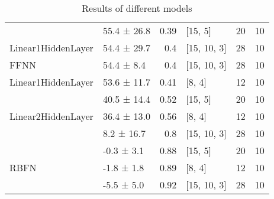 \begin{table*}
\begin{tabular}{llrlrr}
                                     & 55.4 ± 26.8 &  0.39 & [15, 5]        &         20 &       10 \\
 Linear1HiddenLayer                  & 54.4 ± 29.7 &  0.4  & [15, 10, 3]    &         28 &       10 \\
 FFNN                                & 54.4 ± 8.4  &  0.4  & [15, 10, 3]    &         28 &       10 \\
 Linear1HiddenLayer                  & 53.6 ± 11.7 &  0.41 & [8, 4]         &         12 &       10 \\
 \multirow{3}{*}{Linear2HiddenLayer} & 40.5 ± 14.4 &  0.52 & [15, 5]        &         20 &       10 \\
                                     & 36.4 ± 13.0 &  0.56 & [8, 4]         &         12 &       10 \\
                                     & 8.2 ± 16.7  &  0.8  & [15, 10, 3]    &         28 &       10 \\
 \multirow{3}{*}{RBFN}               & -0.3 ± 3.1  &  0.88 & [15, 5]        &         20 &       10 \\
                                     & -1.8 ± 1.8  &  0.89 & [8, 4]         &         12 &       10 \\
                                     & -5.5 ± 5.0  &  0.92 & [15, 10, 3]    &         28 &       10 \\
\hline
\end{tabular}
        \caption{Results of different models}
        \label{models}
    \end{table*}
    
